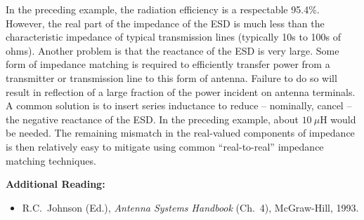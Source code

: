 In the preceding example, the radiation efficiency is a respectable 95.4\%. 
However, the real part of the impedance of the ESD is much less than the characteristic impedance of typical transmission lines (typically 10s to 100s of ohms).
Another problem is that the reactance of the ESD is very large.
Some form of impedance matching is required to efficiently transfer power from a transmitter or transmission line to this form of antenna.
Failure to do so will result in reflection of a large fraction of the power incident on antenna terminals.
A common solution is to insert series inductance to reduce -- nominally, cancel -- the negative reactance of the ESD.
In the preceding example, about $10~\mu$H would be needed.
The remaining mismatch in the real-valued components of impedance is then relatively easy to mitigate using common ``real-to-real'' impedance matching techniques. 


{\bf Additional Reading:}
\begin{itemize}
\item R.C.\ Johnson (Ed.), \emph{Antenna Systems Handbook} (Ch.\ 4), McGraw-Hill, 1993.
\end{itemize}



